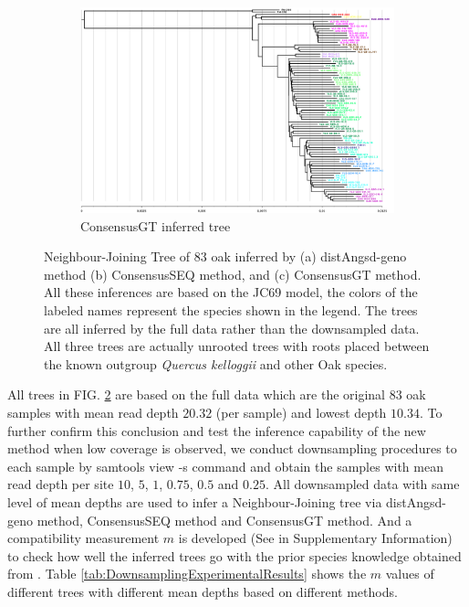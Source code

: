 \documentclass{article}
\begin{document}
\begin{figure}[ht]\ContinuedFloat
    \begin{subfigure}[b]{0.95\textwidth}
    \includegraphics[width=\textwidth]{JCAmatrix_full_nofiltering.in_bionj.t.png}
    \caption{ConsensusGT inferred tree}
    \label{fig:ConsensusGTOakTree}
    \end{subfigure}
    \vspace{0.5cm}
    \caption{Neighbour-Joining Tree of $83$ oak inferred by (a) distAngsd-geno method (b) ConsensusSEQ method, and (c) ConsensusGT method. All these inferences are based on the JC69 model, the colors of the labeled names represent the species shown in the legend. The trees are all inferred by the full data rather than the downsampled data. All three trees are actually unrooted trees with roots placed between the known outgroup {\it Quercus kelloggii} and other Oak species.}
    \label{fig:OakTree}
\end{figure}

All trees in FIG. \ref{fig:OakTree} are based on the full data which are the original $83$ oak samples with mean read depth $20.32$ (per sample) and lowest depth $10.34$. To further confirm this conclusion and test the inference capability of the new method when low coverage is observed, we conduct downsampling procedures to each sample by samtools view -s command and obtain the samples with mean read depth per site $10$, $5$, $1$, $0.75$, $0.5$ and $0.25$. All downsampled data with same level of mean depths are used to infer a Neighbour-Joining tree via distAngsd-geno method, ConsensusSEQ method and ConsensusGT method. And a compatibility measurement $m$ is developed (See in Supplementary Information) to check how well the inferred trees go with the prior species knowledge obtained from \cite{Fitz-Gibbon_Hipp_Pham_Manos_Sork:2017}. Table \ref{tab:DownsamplingExperimentalResults} shows the $m$ values of different trees with different mean depths based on different methods.
\end{document}
